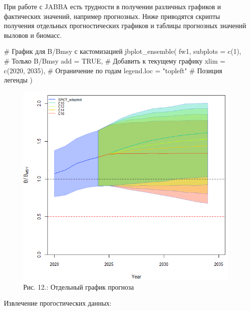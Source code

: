 \documentclass[
  letterpaper,
  DIV=11,
  numbers=noendperiod]{scrreprt}
\newenvironment{Shaded}{\begin{snugshade}}{\end{snugshade}}
\newcommand{\AttributeTok}[1]{\textcolor[rgb]{0.40,0.45,0.13}{#1}}
\newcommand{\CommentTok}[1]{\textcolor[rgb]{0.37,0.37,0.37}{#1}}
\newcommand{\ConstantTok}[1]{\textcolor[rgb]{0.56,0.35,0.01}{#1}}
\newcommand{\DecValTok}[1]{\textcolor[rgb]{0.68,0.00,0.00}{#1}}
\newcommand{\FunctionTok}[1]{\textcolor[rgb]{0.28,0.35,0.67}{#1}}
\newcommand{\NormalTok}[1]{\textcolor[rgb]{0.00,0.23,0.31}{#1}}
\newcommand{\StringTok}[1]{\textcolor[rgb]{0.13,0.47,0.30}{#1}}
\begin{document}
При работе с JABBA есть трудности в получении различных графиков и
фактических значений, например прогнозных. Ниже приводятся скрипты
получения отдельных прогностических графиков и таблицы прогнозных
значений выловов и биомасс.

\begin{Shaded}
\begin{Highlighting}[]
\CommentTok{\# График для B/Bmsy с кастомизацией}
\FunctionTok{jbplot\_ensemble}\NormalTok{(}
\NormalTok{  fw1,}
  \AttributeTok{subplots =} \FunctionTok{c}\NormalTok{(}\DecValTok{1}\NormalTok{),        }\CommentTok{\# Только B/Bmsy}
  \AttributeTok{add =} \ConstantTok{TRUE}\NormalTok{,             }\CommentTok{\# Добавить к текущему графику}
  \AttributeTok{xlim =} \FunctionTok{c}\NormalTok{(}\DecValTok{2020}\NormalTok{, }\DecValTok{2035}\NormalTok{),   }\CommentTok{\# Ограничение по годам}
  \AttributeTok{legend.loc =} \StringTok{"topleft"}  \CommentTok{\# Позиция легенды}
\NormalTok{)}
\end{Highlighting}
\end{Shaded}

\begin{figure}[H]

{\centering \includegraphics[width=0.8\linewidth,height=\textheight,keepaspectratio]{images/JABBA12.png}

}

\caption{Рис. 12.: Отдельный график прогноза}

\end{figure}%

Извлечение прогостических данных:
\end{document}
